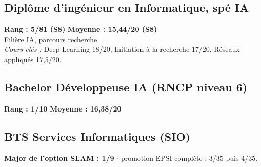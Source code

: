 \documentclass{assets/template/cvclass}
\def\spaceSections{0.13cm}
\begin{document}
\begin{area-left}
    \subsection{Diplôme d'ingénieur en Informatique, spé IA}
    \textbf{Rang : 5/81 (S8)} \hfill \textbf{Moyenne : 15,44/20 (S8)}\\
    Filière IA, parcours recherche\\
    \textit{Cours clés :} Deep Learning 18/20, Initiation à la recherche 17/20, Réseaux appliqués 17,5/20.

    \vspace{\spaceSections}
    \subsection{Bachelor Développeuse IA (RNCP niveau 6)}
    \textbf{Rang : 1/10} \hfill \textbf{Moyenne : 16,38/20}

    \vspace{\spaceSections}
    \subsection{BTS Services Informatiques (SIO)}
    \textbf{Major de l'option SLAM : 1/9} $\cdot$ promotion EPSI complète : 3/35 puis 4/35.


\end{area-left}
\end{document}
